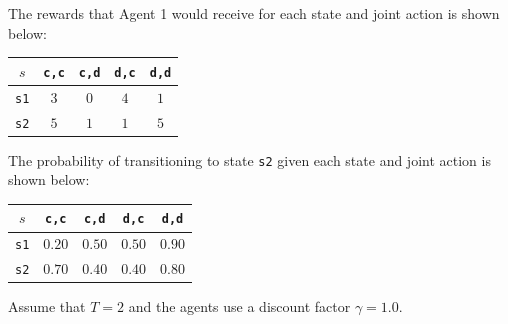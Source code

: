 \medskip\noindent
The rewards that Agent 1 would receive for each state and joint action is shown below:

\begin{table}[H]
\centering
\begin{tabular}{|c|c|c|c|c|}
\hline
$s$ & \texttt{c,c} & \texttt{c,d} & \texttt{d,c} & \texttt{d,d} \\\hline
\texttt{s1} & $3$ & $0$ & $4$ & $1$ \\\hline
\texttt{s2} & $5$ & $1$ & $1$ & $5$ \\\hline
\end{tabular}
\end{table}

\noindent
\noindent The probability of transitioning to state \texttt{s2} given each state and joint action is shown below:

\begin{table}[H]
\centering
\begin{tabular}{|c|c|c|c|c|}
\hline
$s$ & \texttt{c,c} & \texttt{c,d} & \texttt{d,c} & \texttt{d,d} \\\hline
\texttt{s1} & $0.20$ & $0.50$ & $0.50$ & $0.90$ \\\hline
\texttt{s2} & $0.70$ & $0.40$ & $0.40$ & $0.80$ \\\hline
\end{tabular}
\end{table}

\noindent
\noindent Assume that $T=2$ and the agents use a discount factor $\gamma=1.0$.

